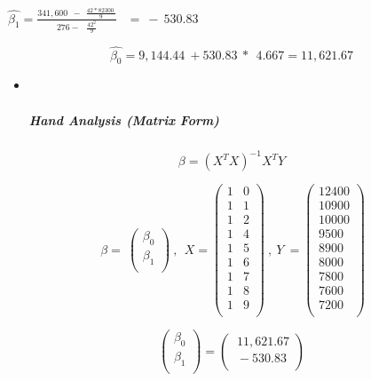 \documentclass[
]{article}
\begin{document}
\(\widehat{\beta_{1}} = \frac{341,600\ \  - \ \ \frac{42*82300\ }{9}}{276 - \ \ \ \frac{42^{2}}{9}}\ \ \)
\(= \  - \ 530.83\)

\[\widehat{\beta_{0}} = 9,144.44\  + 530.83\ *\ \ 4.667 = 11,621.67\]

\begin{itemize}
\item ~
  \hypertarget{hand-analysis-matrix-form-3}{%
  \subparagraph{\texorpdfstring{\textbf{Hand Analysis (Matrix
  Form)}}{Hand Analysis (Matrix Form)}}\label{hand-analysis-matrix-form-3}}
\end{itemize}

\[\beta = {(X^{T}X)}^{- 1}X^{T}Y\]

\[\ \beta = \ \begin{pmatrix}
\beta_{0} \\
\beta_{1} \\
\end{pmatrix}\ ,\ \ X = \begin{pmatrix}
1 & 0 \\
1 & 1 \\
1 & 2 \\
1 & 4 \\
1 & 5 \\
1 & 6 \\
1 & 7 \\
1 & 8 \\
1 & 9 \\
\end{pmatrix}\ ,\ Y\  = \begin{pmatrix}
12400 \\
10900 \\
10000 \\
9500 \\
8900 \\
8000 \\
7800 \\
7600 \\
7200 \\
\end{pmatrix}\]

\[\begin{pmatrix}
\beta_{0} \\
\beta_{1} \\
\end{pmatrix} = \begin{pmatrix}
\ 11,621.67 \\
\  - 530.83 \\
\end{pmatrix}\]
\end{document}
